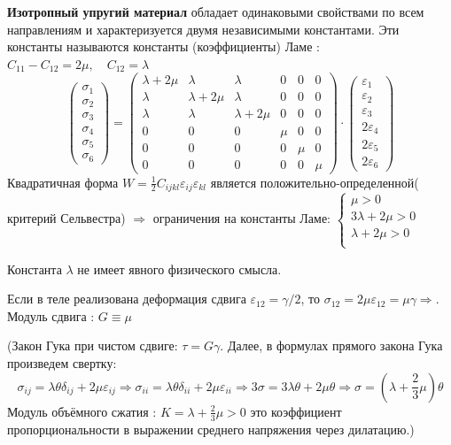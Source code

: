 \textbf{Изотропный упругий материал} обладает одинаковыми свойствами по всем направлениям и характеризуется двумя независимыми константами. Эти константы называются константы (коэффициенты) Ламе : $C_{11}-C_{12}=2 \mu, \quad C_{12}=\lambda$
$$
\left(\begin{array}{c}
\sigma_1 \\
\sigma_2 \\
\sigma_3 \\
\sigma_4 \\
\sigma_5 \\
\sigma_6
\end{array}\right)=\left(\begin{array}{cccccc}
\lambda+2 \mu & \lambda & \lambda & 0 & 0 & 0 \\
\lambda & \lambda+2 \mu & \lambda & 0 & 0 & 0 \\
\lambda & \lambda & \lambda+2 \mu & 0 & 0 & 0 \\
0 & 0 & 0 & \mu & 0 & 0 \\
0 & 0 & 0 & 0 & \mu & 0 \\
0 & 0 & 0 & 0 & 0 & \mu
\end{array}\right) \cdot\left(\begin{array}{c}
\varepsilon_1 \\
\varepsilon_2 \\
\varepsilon_3 \\
2 \varepsilon_4 \\
2 \varepsilon_5 \\
2 \varepsilon_6
\end{array}\right)
$$
Квадратичная форма $W=\frac{1}{2} C_{i j k l} \varepsilon_{i j} \varepsilon_{k l}$ является положительно-определенной( критерий Сельвестра) $ \Rightarrow$ ограничения на константы Ламе:
$\left\{ \begin{array}{c}
     \mu>0\\
      3\lambda+2\mu>0\\
    \lambda+2\mu>0 \\
        \end{array}\right.$

        
Константа $\lambda$ не имеет явного физического смысла. 

Если в теле реализована деформация сдвига $\varepsilon_{12}=\gamma / 2$, то $\sigma_{12}=2 \mu \varepsilon_{12}=\mu \gamma  \Rightarrow $. Модуль сдвига : $G \equiv \mu$


(Закон Гука при чистом сдвиге: $\tau=G \gamma$. Далее, в формулах прямого закона Гука произведем свертку:
$$
\sigma_{i j}=\lambda \theta \delta_{i j}+2 \mu \varepsilon_{i j} \Rightarrow \sigma_{i i}=\lambda \theta \delta_{i i}+2 \mu \varepsilon_{i i} \Rightarrow 3 \sigma=3 \lambda \theta+2 \mu \theta \Rightarrow \sigma=\left(\lambda+\frac{2}{3} \mu\right) \theta
$$
Модуль объёмного сжатия : $K=\lambda+\frac{2}{3} \mu>0$ это коэффициент пропорциональности в выражении среднего напряжения через дилатацию.)

